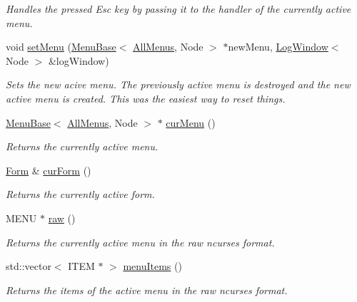 \begin{DoxyCompactItemize}
\begin{DoxyCompactList}\small\item\em Handles the pressed Esc key by passing it to the handler of the currently active menu. \end{DoxyCompactList}\item 
void \hyperlink{structAllMenus_afb8cd847d5b48c078d8009d2da649053}{set\+Menu} (\hyperlink{structMenuBase}{Menu\+Base}$<$ \hyperlink{structAllMenus}{All\+Menus}, Node $>$ $\ast$new\+Menu, \hyperlink{structLogWindow}{Log\+Window}$<$ Node $>$ \&log\+Window)
\begin{DoxyCompactList}\small\item\em Sets the new acive menu. The previously active menu is destroyed and the new active menu is created. This was the easiest way to reset things. \end{DoxyCompactList}\item 
\hyperlink{structMenuBase}{Menu\+Base}$<$ \hyperlink{structAllMenus}{All\+Menus}, Node $>$ $\ast$ \hyperlink{structAllMenus_a9cea512531b7836f2597d21ba4ed3c05}{cur\+Menu} ()
\begin{DoxyCompactList}\small\item\em Returns the currently active menu. \end{DoxyCompactList}\item 
\hyperlink{structForm}{Form} \& \hyperlink{structAllMenus_ae1e3a1a7363b1bf71f3f84f7ffecd7e4}{cur\+Form} ()
\begin{DoxyCompactList}\small\item\em Returns the currently active form. \end{DoxyCompactList}\item 
M\+E\+NU $\ast$ \hyperlink{structAllMenus_a2828529e873a27cfc66df5fc22199367}{raw} ()
\begin{DoxyCompactList}\small\item\em Returns the currently active menu in the raw {\ttfamily ncurses} format. \end{DoxyCompactList}\item 
std\+::vector$<$ I\+T\+EM $\ast$ $>$ \hyperlink{structAllMenus_add93d7be2cf96634cddcbaa56c8a1ff2}{menu\+Items} ()
\begin{DoxyCompactList}\small\item\em Returns the items of the active menu in the raw {\ttfamily ncurses} format. \end{DoxyCompactList}\end{DoxyCompactItemize}
